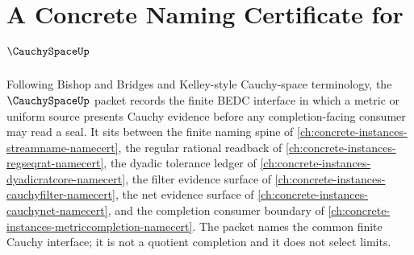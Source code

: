 \chapter{A Concrete Naming Certificate for $\CauchySpaceUp$}
\label{ch:concrete-instances-cauchyspace-namecert}

Following Bishop and Bridges and Kelley-style Cauchy-space terminology, the $\CauchySpaceUp$ packet records the finite BEDC interface in which a metric or uniform source presents Cauchy evidence before any completion-facing consumer may read a seal. It sits between the finite naming spine of \autoref{ch:concrete-instances-streamname-namecert}, the regular rational readback of \autoref{ch:concrete-instances-regseqrat-namecert}, the dyadic tolerance ledger of \autoref{ch:concrete-instances-dyadicratcore-namecert}, the filter evidence surface of \autoref{ch:concrete-instances-cauchyfilter-namecert}, the net evidence surface of \autoref{ch:concrete-instances-cauchynet-namecert}, and the completion consumer boundary of \autoref{ch:concrete-instances-metriccompletion-namecert}. The packet names the common finite Cauchy interface; it is not a quotient completion and it does not select limits.

